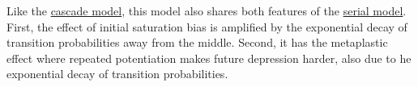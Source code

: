 \documentclass[12pt]{article}
\begin{document}
Like the \hyperref[sec:cascade]{cascade model}, this model also shares both features of the \hyperref[sec:multistate]{serial model}.
First, the effect of initial saturation bias is amplified by the exponential decay of transition probabilities away from the middle.
Second, it has the metaplastic effect where repeated potentiation makes future depression harder, also due to he exponential decay of transition probabilities.





\end{document}

